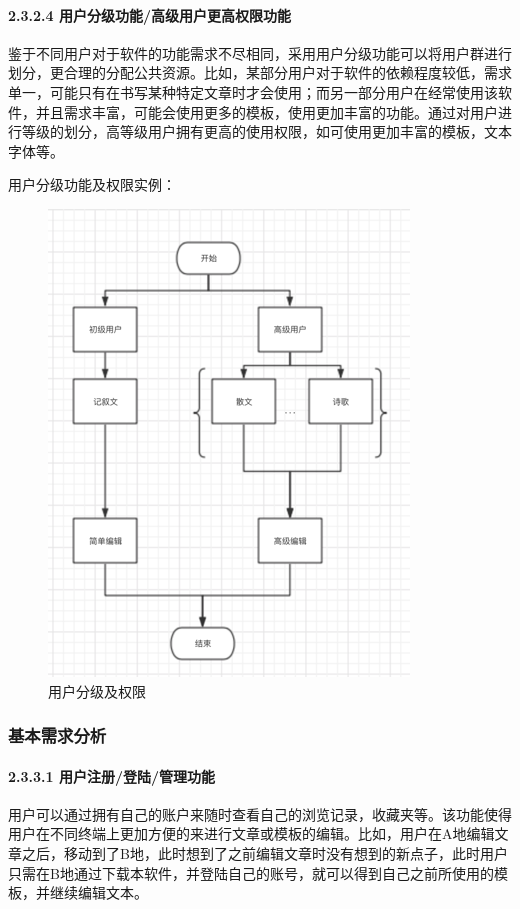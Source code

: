 \documentclass[10pt,letterpaper]{article}
\begin{document}
\paragraph{2.3.2.4 用户分级功能/高级用户更高权限功能}
\rule{0pt}{0pt} 

鉴于不同用户对于软件的功能需求不尽相同，采用用户分级功能可以将用户群进行划分，更合理的分配公共资源。比如，某部分用户对于软件的依赖程度较低，需求单一，可能只有在书写某种特定文章时才会使用；而另一部分用户在经常使用该软件，并且需求丰富，可能会使用更多的模板，使用更加丰富的功能。通过对用户进行等级的划分，高等级用户拥有更高的使用权限，如可使用更加丰富的模板，文本字体等。

用户分级功能及权限实例：

\begin{figure}[H]
	\begin{center}
		\includegraphics[width=0.5\linewidth]{___10.png}
		\caption{用户分级及权限}
		\label{Fig:1}
	\end{center}
	\vspace{-0.5em}
\end{figure}

\subsubsection{基本需求分析}
\paragraph{2.3.3.1 用户注册/登陆/管理功能}
\rule{0pt}{0pt} 

用户可以通过拥有自己的账户来随时查看自己的浏览记录，收藏夹等。该功能使得用户在不同终端上更加方便的来进行文章或模板的编辑。比如，用户在A地编辑文章之后，移动到了B地，此时想到了之前编辑文章时没有想到的新点子，此时用户只需在B地通过下载本软件，并登陆自己的账号，就可以得到自己之前所使用的模板，并继续编辑文本。
\end{document}
